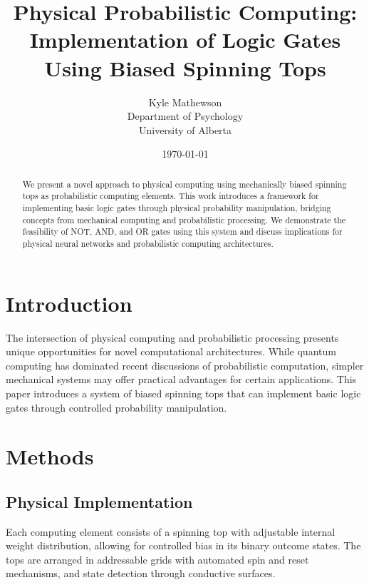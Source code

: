 \documentclass{article}
\title{Physical Probabilistic Computing: Implementation of Logic Gates Using Biased Spinning Tops}
\author{Kyle Mathewson\\
Department of Psychology\\
University of Alberta}
\date{\today}
\begin{document}
\maketitle

\begin{abstract}
We present a novel approach to physical computing using mechanically biased spinning tops as probabilistic computing elements. This work introduces a framework for implementing basic logic gates through physical probability manipulation, bridging concepts from mechanical computing and probabilistic processing. We demonstrate the feasibility of NOT, AND, and OR gates using this system and discuss implications for physical neural networks and probabilistic computing architectures.
\end{abstract}

\section{Introduction}
The intersection of physical computing and probabilistic processing presents unique opportunities for novel computational architectures. While quantum computing has dominated recent discussions of probabilistic computation, simpler mechanical systems may offer practical advantages for certain applications. This paper introduces a system of biased spinning tops that can implement basic logic gates through controlled probability manipulation.

\section{Methods}
\subsection{Physical Implementation}
Each computing element consists of a spinning top with adjustable internal weight distribution, allowing for controlled bias in its binary outcome states. The tops are arranged in addressable grids with automated spin and reset mechanisms, and state detection through conductive surfaces.
\end{document}
